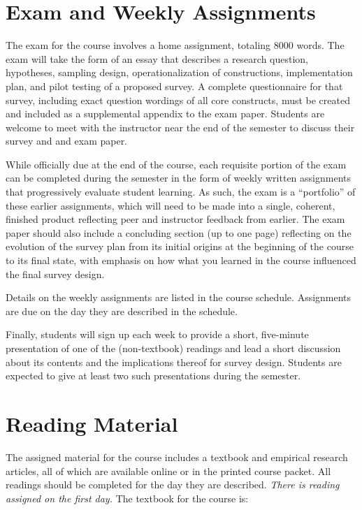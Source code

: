 \documentclass[12pt,a4paper]{article}
\begin{document}
\section{Exam and Weekly Assignments}
The exam for the course involves a home assignment, totaling 8000 words. The exam will take the form of an essay that describes a research question, hypotheses, sampling design, operationalization of constructions, implementation plan, and pilot testing of a proposed survey. A complete questionnaire for that survey, including exact question wordings of all core constructs, must be created and included as a supplemental appendix to the exam paper. Students are welcome to meet with the instructor near the end of the semester to discuss their survey and and exam paper.

While officially due at the end of the course, each requisite portion of the exam can be completed during the semester in the form of weekly written assignments that progressively evaluate student learning. As such, the exam is a ``portfolio'' of these earlier assignments, which will need to be made into a single, coherent, finished product reflecting peer and instructor feedback from earlier. The exam paper should also include a concluding section (up to one page) reflecting on the evolution of the survey plan from its initial origins at the beginning of the course to its final state, with emphasis on how what you learned in the course influenced the final survey design.

Details on the weekly assignments are listed in the course schedule. Assignments are due on the day they are described in the schedule.

Finally, students will sign up each week to provide a short, five-minute presentation of one of the (non-textbook) readings and lead a short discussion about its contents and the implications thereof for survey design. Students are expected to give at least two such presentations during the semester.


\section{Reading Material}
The assigned material for the course includes a textbook and empirical research articles, all of which are available online or in the printed course packet. All readings should be completed for the day they are described. {\em There is reading assigned on the first day.} The textbook for the course is:\\
\end{document}
